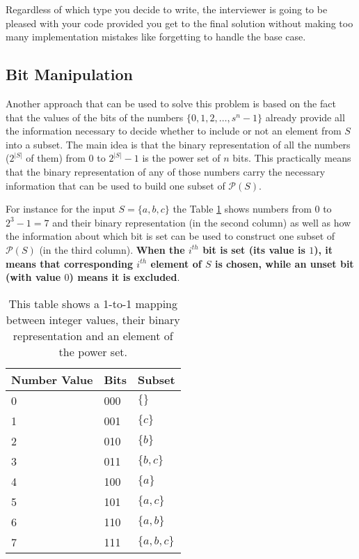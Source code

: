 Regardless of which type you decide to write, the interviewer is going to be pleased with your code provided you get to the final solution
without making too many implementation mistakes like forgetting to handle the base case.

\subsection{Bit Manipulation}

Another approach that can be used to solve this problem is based on the fact that the values of the
bits of the numbers $\{0,1,2,\ldots, s^n-1\}$  already provide all the information necessary to decide whether to include or not an element from $S$ into a subset. 
The main idea is that the binary representation of all the numbers ($2^{|S|}$ of them) from $0$ to $2^{|S|}-1$ is the power set of $n$ bits.
This practically means that the binary representation of any of those numbers carry the necessary information that can be used to build one subset of $\mathcal{P}(S)$. 


For instance for the input $S=\{a,b,c\}$ the Table \ref{tab:mapping_value_bits} shows numbers from $0$ to $2^3-1 = 7$ and their binary representation (in the second column) as well as how the information about which bit is set can be used to construct one
subset of $\mathcal{P}(S)$ (in the third column).
\textbf{When the $i^{th}$ bit is set (its value is $1$), it means that
corresponding $i^{th}$ element of $S$ is chosen, while an unset bit (with value $0$) means it is
excluded}.


\begin{table}
    \centering
    \begin{tabular}{|l|l|l|}
        \hline
        Number Value & Bits & Subset\\ \hline
        0     & 000  & $\{\}$\\ \hline
        1     & 001  & $\{c\}$\\ \hline
        2     & 010  & $\{b\}$\\ \hline
        3     & 011  & $\{b,c\}$\\ \hline
        4     & 100  & $\{a\}$\\ \hline
        5     & 101  & $\{a,c\}$\\ \hline
        6     & 110  & $\{a,b\}$\\ \hline
        7     & 111  & $\{a,b,c\}$ \\ \hline
    \end{tabular}
    \caption[Mapping between bits and element of the power set.]{This table shows a 1-to-1 mapping between integer values, their binary representation and an element of the power set.}
    \label{tab:mapping_value_bits}
\end{table}


